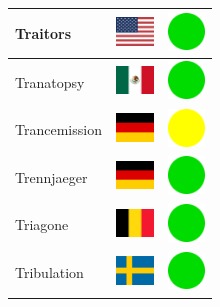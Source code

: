 \documentclass[12pt, a4paper, twoside]{report}
\begin{document}
\begin{center}
\begin{longtable}{|p{5cm}|p{2cm}|p{2cm}|}
 Traitors                                                   & \includegraphics[width=1cm]{../4x3/us} &   \includegraphics[width=1cm]{../likes/y} \\ \hline
 Tranatopsy                                                 & \includegraphics[width=1cm]{../4x3/mx} &   \includegraphics[width=1cm]{../likes/y} \\ \hline
 Trancemission                                              & \includegraphics[width=1cm]{../4x3/de} &   \includegraphics[width=1cm]{../likes/m} \\ \hline
 Trennjaeger                                                & \includegraphics[width=1cm]{../4x3/de} &   \includegraphics[width=1cm]{../likes/y} \\ \hline
 Triagone                                                   & \includegraphics[width=1cm]{../4x3/be} &   \includegraphics[width=1cm]{../likes/y} \\ \hline
 Tribulation                                                & \includegraphics[width=1cm]{../4x3/se} &   \includegraphics[width=1cm]{../likes/y} \\ \hline

\end{longtable}
\end{center}
\end{document}
